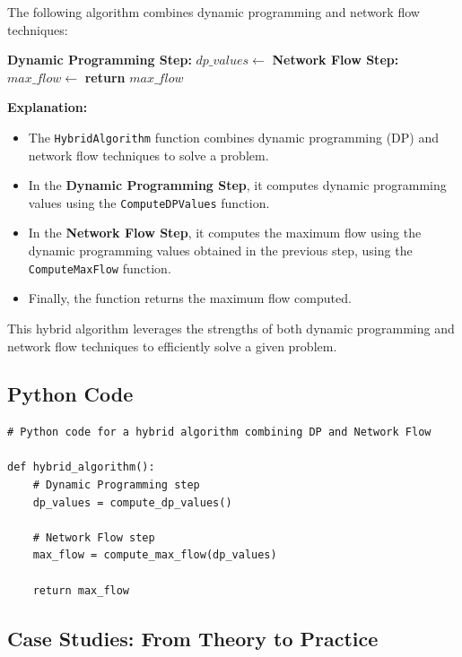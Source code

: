 \documentclass[12pt]{book} %
\begin{document}
The following algorithm combines dynamic programming and network flow techniques:
\FloatBarrier
\begin{algorithm}
\caption{Hybrid Algorithm}\label{hybrid-algorithm}
\begin{algorithmic}[1]
    \State \textbf{Dynamic Programming Step:}
    \State $dp\_values \gets$ 
    \State \textbf{Network Flow Step:}
    \State $max\_flow \gets$ 
    \State \textbf{return} $max\_flow$
\EndProcedure
\end{algorithmic}
\end{algorithm}
\FloatBarrier
\textbf{Explanation:}
\begin{itemize}
    \item The \texttt{HybridAlgorithm} function combines dynamic programming (DP) and network flow techniques to solve a problem.
    \item In the \textbf{Dynamic Programming Step}, it computes dynamic programming values using the \texttt{ComputeDPValues} function.
    \item In the \textbf{Network Flow Step}, it computes the maximum flow using the dynamic programming values obtained in the previous step, using the \texttt{ComputeMaxFlow} function.
    \item Finally, the function returns the maximum flow computed.
\end{itemize}

This hybrid algorithm leverages the strengths of both dynamic programming and network flow techniques to efficiently solve a given problem.


\subsection{Python Code}

\FloatBarrier
\begin{lstlisting}
# Python code for a hybrid algorithm combining DP and Network Flow

def hybrid_algorithm():
    # Dynamic Programming step
    dp_values = compute_dp_values()
    
    # Network Flow step
    max_flow = compute_max_flow(dp_values)
    
    return max_flow
\end{lstlisting}
\FloatBarrier

\subsection{Case Studies: From Theory to Practice}
\end{document}
